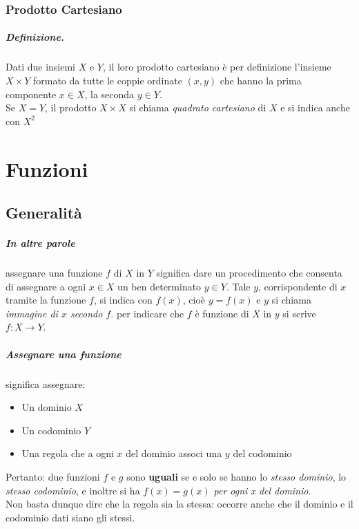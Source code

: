 \documentclass[12pt, a4paper, openany]{book}
\begin{document}
\subsection*{Prodotto Cartesiano}
\paragraph{Definizione.}Dati due insiemi $X$ e $Y$, il loro prodotto cartesiano è per definizione l'insieme $X \times Y$ formato da tutte le coppie ordinate $(x,y)$ che hanno la prima componente $x \in X$, la seconda $y \in Y$.\\
Se $X = Y$, il prodotto $X \times X$ si chiama \emph{quadrato cartesiano} di $X$ e si indica anche con $X^2$

\chapter{Funzioni}

\section{Generalità}
\paragraph{In altre parole} assegnare una funzione $f$ di $X$ in $Y$ significa dare un procedimento che consenta di assegnare a ogni $x \in X$ un ben determinato $y \in Y$. Tale $y$, corrispondente di $x$ tramite la funzione $f$, si indica con $f(x)$, cioè $y = f(x)$ e $y$ si chiama \emph{immagine di $x$ secondo $f$}. per indicare che $f$ è funzione di $X$ in $y$ si scrive $f: X \rightarrow Y$.

\paragraph{Assegnare una funzione} significa assegnare:
\begin{itemize}
	\item Un dominio $X$
	\item Un codominio $Y$
	\item Una regola che a ogni $x$ del dominio associ una $y$ del codominio
\end{itemize}
Pertanto: due funzioni $f$ e $g$ sono \textbf{uguali} se e solo se hanno lo \emph{stesso dominio}, lo\emph{ stesso codominio}, e inoltre si ha \emph{$f(x) = g(x)$ per ogni x del dominio}.\\
Non basta dunque dire che la regola sia la stessa: occorre anche che il dominio e il codominio dati siano gli stessi.
\end{document}
